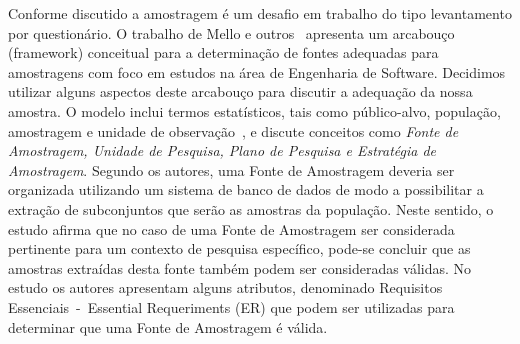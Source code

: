 Conforme discutido a amostragem é um desafio em trabalho do tipo levantamento
por questionário. O trabalho de Mello e outros~\cite{de2014towards} apresenta um
arcabouço (framework) conceitual para a determinação de fontes adequadas para
amostragens com foco em estudos na área de Engenharia de Software. Decidimos
utilizar alguns aspectos deste arcabouço para discutir a adequação da nossa
amostra. O modelo inclui termos estatísticos, tais como público-alvo, população,
amostragem e unidade de observação~\cite{thompson2012sampling}, e discute
conceitos como \textit{Fonte de Amostragem, Unidade de Pesquisa, Plano de
    Pesquisa e Estratégia de Amostragem}. Segundo os autores, uma Fonte de
Amostragem deveria ser organizada utilizando um sistema de banco de dados de
modo a possibilitar a extração de subconjuntos que serão as amostras da
população. Neste sentido, o estudo afirma que no caso de uma Fonte de Amostragem
ser considerada pertinente para um contexto de pesquisa específico, pode-se
concluir que as amostras extraídas desta fonte também podem ser consideradas
válidas. No estudo os autores apresentam alguns atributos, denominado Requisitos
Essenciais~-~Essential Requeriments (ER) que podem ser utilizadas para
determinar que uma Fonte de Amostragem é válida.


